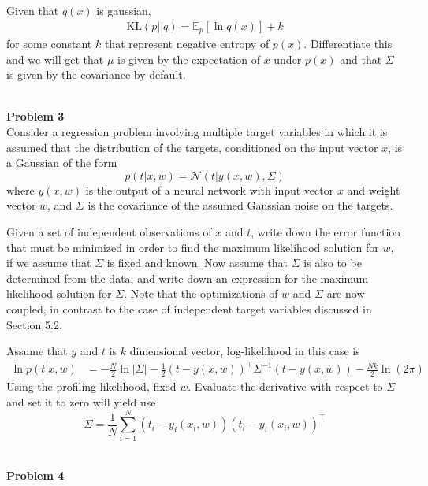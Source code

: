 \documentclass{article}
\begin{document}
\color{blue}
\begin{sol}
    Given that $q(x)$ is gaussian,
    \begin{align*}
      \text{KL}(p||q) = \mathbb{E}_p[\ln q(x)] + k
    \end{align*}
    for some constant $k$ that represent negative entropy of $p(x)$. Differentiate this and we will get that $\mu$ is given by the expectation of $x$ under $p(x)$ and that $\Sigma$ is given by the covariance by default.
\end{sol}
\color{black}
\leavevmode\\
\noindent
\Large{\textbf{Problem 3}}\normalsize
\\

Consider a regression problem involving multiple target variables in which it is assumed that the
distribution of the targets, conditioned on the input vector $x$, is a Gaussian of the form
\[p(t|x,w) = \mathcal{N}(t|y(x,w), \Sigma)\]
where $y(x,w)$ is the output of a neural network with input vector $x$ and weight vector $w$, and $\Sigma$ is
the covariance of the assumed Gaussian noise on the targets.

Given a set of independent observations of $x$ and $t$, write down the error function that must be
minimized in order to find the maximum likelihood solution for $w$, if we assume that $\Sigma$ is fixed
and known. Now assume that $\Sigma$ is also to be determined from the data, and write down an
expression for the maximum likelihood solution for $\Sigma$. Note that the optimizations of $w$ and $\Sigma$ are
now coupled, in contrast to the case of independent target variables discussed in Section 5.2.
\color{blue}
\begin{sol}
Assume that $y$ and $t$ is $k$ dimensional vector, log-likelihood in this case is
\begin{align*}
  \ln p(t|x,w) &= -\frac{N}{2}\ln|\Sigma| - \frac{1}{2}(t-y(x,w))^\top\Sigma^{-1}(t-y(x,w)) - \frac{Nk}{2}\ln(2\pi)
\end{align*}
Using the profiling likelihood, fixed $w$. Evaluate the derivative with respect to $\Sigma$ and set it to zero will yield use
\[\Sigma = \frac{1}{N}\sum_{i=1}^{N} (t_i-y_i(x_i,w))(t_i-y_i(x_i,w))^\top\]
\end{sol}
\color{black}
\leavevmode\\
\noindent
\Large{\textbf{Problem 4}}\normalsize
\\
\end{document}
